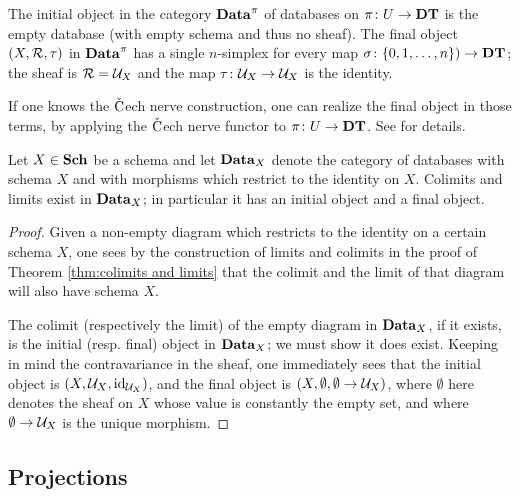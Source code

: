 \documentclass{amsart}
\def\DT{{\bf DT}}
\def\Sch{{\bf Sch}}
\def\Cech{$\check{\tn{C}}$ech }
\def\Data{{\bf Data}}
\begin{document}
\begin{remark}

The initial object in the category $\Data^\pi$ of databases on $\pi\taking U\to\DT$ is the empty database (with empty schema and thus no sheaf).  The final object $(X,\mathcal{R},\tau)$ in $\Data^\pi$ has a single $n$-simplex for every map $\sigma\taking\{0,1,\ldots,n\})\to\DT$; the sheaf is $\mathcal{R}=\mathcal{U}_X$ and the map $\tau\colon\mathcal{U}_X\rightarrow\mathcal{U}_X$ is the identity.

If one knows the \Cech nerve construction, one can realize the final object in those terms, by applying the \Cech nerve functor to $\pi\taking U\to\DT$.  See \cite[]{Spi} for details.

\end{remark}

\begin{corollary}\label{cor:colimits and limits}

Let $X\in\Sch$ be a schema and let $\Data_X$ denote the category of databases with schema $X$ and with morphisms which restrict to the identity on $X$.  Colimits and limits exist in $\Data_X$; in particular it has an initial object and a final object.

\end{corollary}

\begin{proof}

Given a non-empty diagram which restricts to the identity on a certain schema $X$, one sees by the construction of limits and colimits in the proof of Theorem \ref{thm:colimits and limits} that the colimit and the limit of that diagram will also have schema $X$.  

The colimit (respectively the limit) of the empty diagram in $\Data_X$, if it exists, is the initial (resp. final) object in $\Data_X$; we must show it does exist.  Keeping in mind the contravariance in the sheaf, one immediately sees that the initial object is $(X,\mathcal{U}_X,\textnormal{id}_{\mathcal{U}_X})$, and the final object is $(X,\emptyset,\emptyset\rightarrow\mathcal{U}_X)$, where $\emptyset$ here denotes the sheaf on $X$ whose value is constantly the empty set, and where $\emptyset\rightarrow\mathcal{U}_X$ is the unique morphism.


\end{proof}

\subsection{Projections}\label{subsec:projections}
\end{document}
